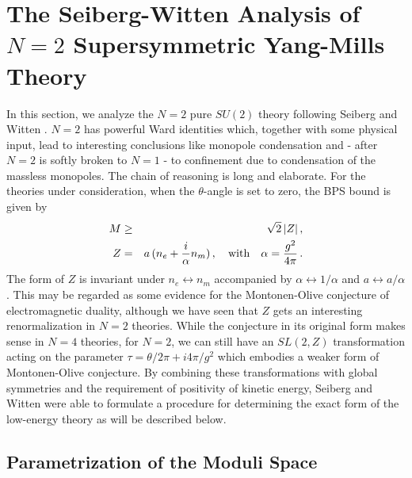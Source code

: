 \section{The Seiberg-Witten Analysis of $N=2$ Supersymmetric
Yang-Mills Theory}

In this section, we analyze the $N = 2$ pure $SU(2)$ theory following
Seiberg and Witten \cite{SW-I}.  $N=2$ has powerful Ward identities
which, together with some physical input, lead to interesting
conclusions like monopole condensation and - after $N = 2$ is softly
broken to $N = 1$ - to confinement due to condensation of the massless
monopoles. The chain of reasoning is long and elaborate.  For the
theories under consideration, when the $\theta$-angle is set to zero,
the BPS bound is given by
\begin{eqnarray}
M &\geq& \sqrt{2}\,\vert Z \vert\,,\nonumber \\
Z &=& a\,(n_e + {i\over \alpha} n_m)\,,\quad{\rm with}\quad 
\alpha = {g^2\over 4\pi}\,. \nonumber
\end{eqnarray}
The form of $Z$ is invariant under $n_e \leftrightarrow n_m$
accompanied by $\alpha\leftrightarrow 1/\alpha$ and $a \leftrightarrow
a/\alpha$. This may be regarded as some evidence for the
Montonen-Olive conjecture of electromagnetic duality, although we have
seen that $Z$ gets an interesting renormalization in $N=2$
theories. While the conjecture in its original form makes sense in
$N=4$ theories, for $N=2$, we can still have an $SL(2, Z)$
transformation acting on the parameter $\tau = \theta/2\pi +
i4\pi/g^2$ which embodies a weaker form of Montonen-Olive
conjecture. By combining these transformations with global symmetries
and the requirement of positivity of kinetic energy, Seiberg and
Witten were able to formulate a procedure for determining the exact
form of the low-energy theory as will be described below.

\subsection{Parametrization of the Moduli Space}

